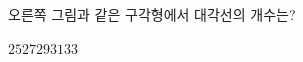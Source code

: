 \hspace*{2mm}\begin{minipage}[t]{\dimexpr\linewidth-2mm\relax}\vspace{0pt}
\noindent\begin{minipage}[t]{0.58\linewidth}\vspace{0pt}\raggedright 오른쪽 그림과 같은 구각형에서 대각선의 개수는?\end{minipage}\hfill\begin{minipage}[t]{0.4\linewidth}\vspace{0pt}\centering \resizebox{\ifdim\width>\linewidth\linewidth\else\width\fi}{!}{}\end{minipage}\par
\begin{choicesii}{$25$}{$27$}{$29$}{$31$}{$33$}\end{choicesii}\end{minipage}
